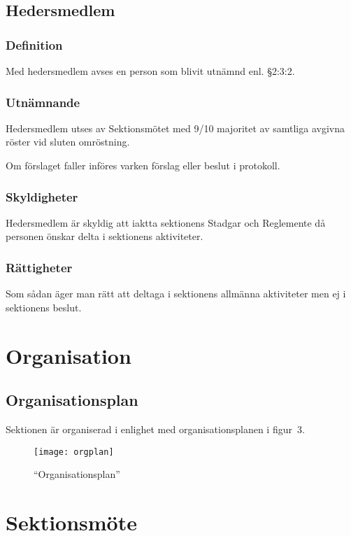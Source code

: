 \documentclass[10pt]{article}
\begin{document}
    \subsection{Hedersmedlem}
    \subsubsection{Definition}
    Med hedersmedlem avses en person som blivit utnämnd enl. §2:3:2.
    
    \subsubsection{Utnämnande}
    Hedersmedlem utses av Sektionsmötet med 9/10 majoritet av samtliga avgivna
    röster vid sluten omröstning.
    
    Om förslaget faller införes varken förslag eller beslut i protokoll.
    
    \subsubsection{Skyldigheter}
    Hedersmedlem är skyldig att iaktta sektionens Stadgar och Reglemente då
    personen önskar delta i sektionens aktiviteter.
    
    \subsubsection{Rättigheter}
    Som sådan äger man rätt att deltaga i sektionens allmänna aktiviteter men ej
    i sektionens beslut.
    \newpage
    
    \section{Organisation}
    \subsection{Organisationsplan}
    Sektionen är organiserad i enlighet med organisationsplanen i figur~3.
    \begin{figure}[h!tbp]
        \centering
        \texttt{[image: orgplan]}
        \caption{``Organisationsplan''}%
        \label{fig:orgplan}%
    \end{figure}%
    \newpage
    
    \section{Sektionsmöte}
\end{document}
